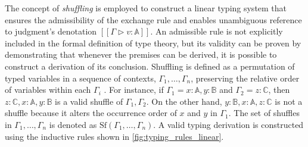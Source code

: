 The concept of \emph{shuffling} is employed to construct a linear typing system that ensures the admissibility of the exchange rule and enables unambiguous reference to judgment's denotation $[\![ \Gamma \triangleright v: \mathbb{A} ]\!]$. An admissible rule is not explicitly included in the formal definition of type theory, but its validity can be proven by demonstrating that whenever the premises can be derived, it is possible to construct a derivation of its conclusion. Shuffling is defined as a permutation of typed variables in a sequence of contexts, $\Gamma_1, \ldots, \Gamma_n$, preserving the relative order of variables within each $\Gamma_i$ \cite{shulman2019practical}. For instance, if $\Gamma_1=x:\mathbb{A}, y:\mathbb{B}$ and $\Gamma_2=z:\mathbb{C}$, then $z:\mathbb{C}, x:\mathbb{A}, y:\mathbb{B}$ is a valid shuffle of $\Gamma_1, \Gamma_2$. On the other hand, $y:\mathbb{B}, x:\mathbb{A}, z:\mathbb{C}$ is not a shuffle because it alters the occurrence order of $x$ and $y$ in $\Gamma_1$. The set of shuffles in $\Gamma_1, \ldots, \Gamma_n$ is denoted as $\text{Sf} (\Gamma_1, \ldots, \Gamma_n)$. A valid typing derivation is constructed using the inductive rules shown in \autoref{fig:typing_rules_linear}.
